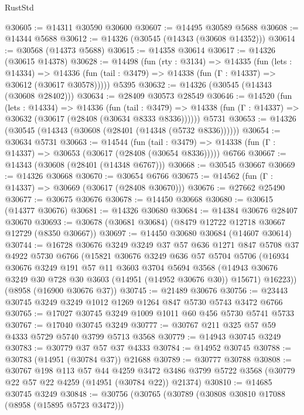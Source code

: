 \begin{lexlean}{RustStd}
\begin{coremodule}
@30605 := @14311 @30590 @30600
@30607 := @14495 @30589 @5688
@30608 := @14344 @5688
@30612 := @14326 (@30545 (@14343 (@30608 @14352)))
@30614 := @30568 (@14373 @5688)
@30615 := @14358 @30614
@30617 := @14326 (@30615 @14378)
@30628 := @14498
    (fun (rty : @3134) =>
    @14335
      (fun (lets : @14334) =>
      @14336 (fun (tail : @3479) => @14338 (fun (Γ : @14337) => @30612 (@30617 @30578)))))
    @5395
@30632 := @14326 (@30545 (@14343 (@30608 @28402)))
@30634 := @28409 @30573 @28549
@30646 := @14520
    (fun (lets : @14334) =>
    @14336
      (fun (tail : @3479) =>
      @14338 (fun (Γ : @14337) => @30632 (@30617 (@28408 (@30634 @8333 @8336))))))
    @5731
@30653 := @14326 (@30545 (@14343 (@30608 (@28401 (@14348 (@5732 @8336))))))
@30654 := @30634 @5731
@30663 := @14544
    (fun (tail : @3479) => @14338 (fun (Γ : @14337) => @30653 (@30617 (@28408 (@30654 @8336)))))
    @6766
@30667 := @14343 (@30608 (@28401 (@14348 @6767)))
@30668 := @30545 @30667
@30669 := @14326 @30668
@30670 := @30654 @6766
@30675 := @14562 (fun (Γ : @14337) => @30669 (@30617 (@28408 @30670)))
@30676 := @27662 @25490
@30677 := @30675 @30676
@30678 := @14450 @30668
@30680 := @30615 (@14377 @30676)
@30681 := @14326 @30680
@30684 := @14384 @30676 @28407 @30670
@30693 := @30678 (@30681 @30684) (@8479 @12722 @12718 @30667 @12729 (@8350 @30667))
@30697 := @14450 @30680 @30684 (@14607 @30614)
@30744 := @16728
    @30676
    @3249
    @3249
    @37
    @57
    @636
    @1271
    @847
    @5708
    @37
    @4922
    @5730
    @6766
    (@15821
      @30676
      @3249
      @636
      @57
      @5704
      @5706
      (@16934
        @30676
        @3249
        @191
        @57
        @11
        @3603
        @3704
        @5694
        @3568
        (@14943 @30676 @3249 @30 @728 @30 @3603 (@14951 (@14952 @30676 @30)) @15671)
        @16223))
    (@8958 (@16900 @30676 @37))
@30745 := @21489 @30676
@30756 := @23443 @30745 @3249 @3249 @1012 @1269 @1264 @847 @5730 @5743 @3472 @6766
@30765 := @17027 @30745 @3249 @1009 @1011 @60 @456 @5730 @5741 @5733
@30767 := @17040 @30745 @3249
@30777 := @30767 @211 @325 @57 @59 @4333 @5729 @5740 @3799 @5713 @3568
@30779 := @14943 @30745 @3249
@30783 := @30779 @37 @57 @37 @4333
@30784 := @14952 @30745
@30788 := @30783 (@14951 (@30784 @37)) @21688
@30789 := @30777 @30788
@30808 := @30767
    @198
    @113
    @57
    @44
    @4259
    @3472
    @3486
    @3799
    @5722
    @3568
    (@30779 @22 @57 @22 @4259 (@14951 (@30784 @22)) @21374)
@30810 := @14685 @30745 @3249
@30848 := @30756
    (@30765
      (@30789
        (@30808 @30810 @17088 (@8958 (@15895 @5723 @3472)))

\end{coremodule}
\end{lexlean}
